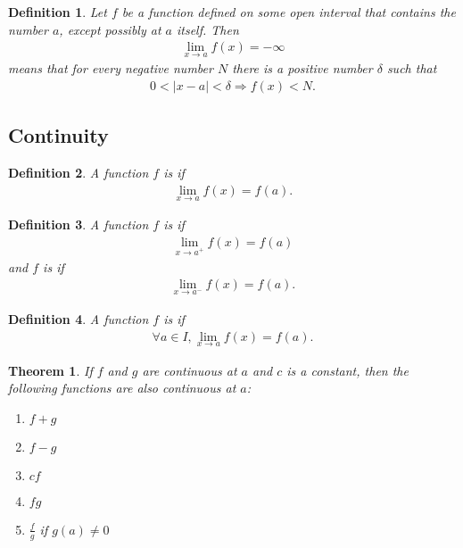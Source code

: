 \documentclass{article}
\theoremstyle{sltheorem}
\newtheorem{definition}{Definition}[section]
\newtheorem{theorem}{Theorem}[section]
\begin{document}
\begin{definition}
    Let $f$ be a function defined on some open interval that contains the number $a$, except possibly at $a$ itself. Then
    \begin{align*}
        \lim_{x\to a}f(x) = -\infty
    \end{align*} 
    means that for every negative number $N$ there is a positive number $\delta$ such that
    \begin{align*}
        0<|x-a|<\delta \Rightarrow f(x)<N.
    \end{align*}
\end{definition}
\subsection{Continuity}
\begin{definition}
    A function $f$ is  if
    \begin{align*}
        \lim_{x\to a}f(x)=f(a).
    \end{align*}
\end{definition}
\begin{definition}
    A function $f$ is  if
    \begin{align*}
        \lim_{x\to a^+}f(x) = f(a)
    \end{align*}
    and $f$ is  if
    \begin{align*}
        \lim_{x\to a^-}f(x) = f(a).
    \end{align*}
\end{definition}
\begin{definition}
    A function $f$ is  if 
    \begin{align*}
        \forall a \in I, \lim_{x\to a}f(x) = f(a).
    \end{align*}
\end{definition}
\begin{theorem}
    If $f$ and $g$ are continuous at $a$ and $c$ is a constant, then the following functions are also continuous at $a$:
    \begin{enumerate}
        \item $f+g$
        \item $f-g$
        \item $cf$
        \item $fg$
        \item $\frac{f}{g}$ if $g(a)\not= 0$
    \end{enumerate}
\end{theorem}
\end{document}
